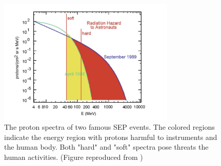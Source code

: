\begin{figure}[!htb]
	\centering
	\includegraphics[width = 0.75\textwidth, height = 0.3\textheight]{images/SEP-radiation_hazard.png}
	\caption[The proton spectra in two \ac{SEP} events indicating the possible radiation energy]{The proton spectra of two famous \ac{SEP} events. The colored regions indicate the energy region with protons harmful to instruments and the human body. Both "hard" and "soft" spectra pose threats the human activities. (Figure reproduced from \citep{Reames2021LNP})}
	\label{Fig:SEP-radiation_hazard}
\end{figure}






